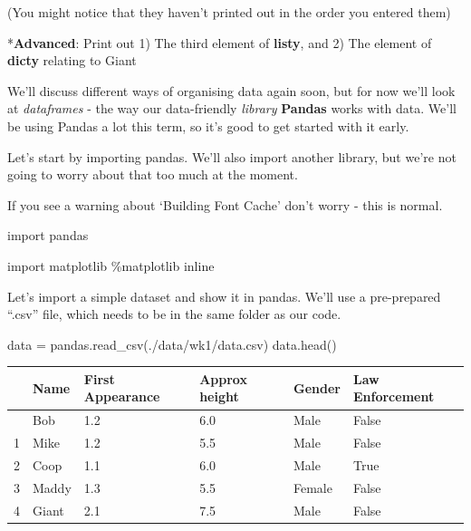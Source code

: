 \documentclass[
  letterpaper,
  DIV=11,
  numbers=noendperiod]{scrreprt}
\newenvironment{Shaded}{\begin{snugshade}}{\end{snugshade}}
\newcommand{\ImportTok}[1]{\textcolor[rgb]{0.00,0.46,0.62}{#1}}
\newcommand{\NormalTok}[1]{\textcolor[rgb]{0.00,0.23,0.31}{#1}}
\newcommand{\OperatorTok}[1]{\textcolor[rgb]{0.37,0.37,0.37}{#1}}
\newcommand{\StringTok}[1]{\textcolor[rgb]{0.13,0.47,0.30}{#1}}
\begin{document}
(You might notice that they haven't printed out in the order you entered
them)

*\textbf{Advanced}: Print out 1) The third element of \textbf{listy},
and 2) The element of \textbf{dicty} relating to Giant

We'll discuss different ways of organising data again soon, but for now
we'll look at \emph{dataframes} - the way our data-friendly
\emph{library} \textbf{Pandas} works with data. We'll be using Pandas a
lot this term, so it's good to get started with it early.

Let's start by importing pandas. We'll also import another library, but
we're not going to worry about that too much at the moment.

If you see a warning about `Building Font Cache' don't worry - this is
normal.

\begin{Shaded}
\begin{Highlighting}[]
\ImportTok{import}\NormalTok{ pandas}

\ImportTok{import}\NormalTok{ matplotlib}
\OperatorTok{\%}\NormalTok{matplotlib inline}
\end{Highlighting}
\end{Shaded}

Let's import a simple dataset and show it in pandas. We'll use a
pre-prepared ``.csv'' file, which needs to be in the same folder as our
code.

\begin{Shaded}
\begin{Highlighting}[]
\NormalTok{data }\OperatorTok{=}\NormalTok{ pandas.read\_csv(}\StringTok{\textquotesingle{}./data/wk1/data.csv\textquotesingle{}}\NormalTok{)}
\NormalTok{data.head()}
\end{Highlighting}
\end{Shaded}

\begin{longtable}[]{@{}llllll@{}}
\toprule\noalign{}
& Name & First Appearance & Approx height & Gender & Law Enforcement \\
\midrule\noalign{}
\endhead
\bottomrule\noalign{}
\endlastfoot
0 & Bob & 1.2 & 6.0 & Male & False \\
1 & Mike & 1.2 & 5.5 & Male & False \\
2 & Coop & 1.1 & 6.0 & Male & True \\
3 & Maddy & 1.3 & 5.5 & Female & False \\
4 & Giant & 2.1 & 7.5 & Male & False \\
\end{longtable}
\end{document}
